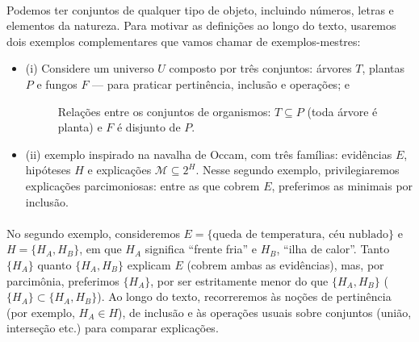\documentclass[12pt,a4paper]{article}
\begin{document}
\paragraph{}
Podemos ter conjuntos de qualquer tipo de objeto, incluindo números, letras e elementos da natureza. Para motivar as definições ao longo do texto, usaremos dois exemplos complementares que vamos chamar de exemplos-mestres:
\begin{itemize}
    \item (i) Considere um universo \(U\) composto por três conjuntos: árvores \(T\), plantas \(P\) e fungos \(F\) — para praticar pertinência, inclusão e operações; e
    
    \begin{figure}[H]
    \centering
    \caption{Relações entre os conjuntos de organismos: $T\subseteq P$ (toda árvore é planta) e $F$ é disjunto de $P$.}
    \label{fig:organismos}
    \end{figure}

    \item (ii) exemplo inspirado na navalha de Occam, com três famílias: evidências \(E\), hipóteses \(H\) e explicações \(\mathcal{M} \subseteq 2^{H}\). Nesse segundo exemplo, privilegiaremos explicações parcimoniosas: entre as que cobrem \(E\), preferimos as minimais por inclusão.
\end{itemize}

\paragraph{}
No segundo exemplo, consideremos \(E=\{\text{queda de temperatura},\, \text{céu nublado}\}\) e \(H=\{H_A, H_B\}\), em que \(H_A\) significa “frente fria” e \(H_B\), “ilha de calor”. Tanto \(\{H_A\}\) quanto \(\{H_A,H_B\}\) explicam \(E\) (cobrem ambas as evidências), mas, por parcimônia, preferimos \(\{H_A\}\), por ser estritamente menor do que \(\{H_A,H_B\}\) (\(\{H_A\} \subset \{H_A,H_B\}\)). Ao longo do texto, recorreremos às noções de pertinência (por exemplo, \(H_A\in H\)), de inclusão e às operações usuais sobre conjuntos (união, interseção etc.) para comparar explicações.
\end{document}
